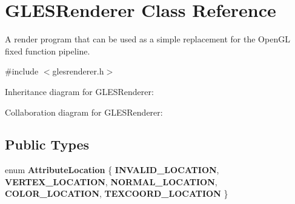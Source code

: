 \hypertarget{class_g_l_e_s_renderer}{}\section{G\+L\+E\+S\+Renderer Class Reference}
\label{class_g_l_e_s_renderer}


A render program that can be used as a simple replacement for the Open\+GL fixed function pipeline.  




{\ttfamily \#include $<$glesrenderer.\+h$>$}



Inheritance diagram for G\+L\+E\+S\+Renderer\+:


Collaboration diagram for G\+L\+E\+S\+Renderer\+:
\subsection*{Public Types}
\begin{DoxyCompactItemize}
\item 
\mbox{\label{class_g_l_e_s_renderer_a05f4cf233d5cf60f4d6ea50ddc06a2c4}} 
enum {\bfseries Attribute\+Location} \{ \newline
{\bfseries I\+N\+V\+A\+L\+I\+D\+\_\+\+L\+O\+C\+A\+T\+I\+ON}, 
{\bfseries V\+E\+R\+T\+E\+X\+\_\+\+L\+O\+C\+A\+T\+I\+ON}, 
{\bfseries N\+O\+R\+M\+A\+L\+\_\+\+L\+O\+C\+A\+T\+I\+ON}, 
{\bfseries C\+O\+L\+O\+R\+\_\+\+L\+O\+C\+A\+T\+I\+ON}, 
\newline
{\bfseries T\+E\+X\+C\+O\+O\+R\+D\+\_\+\+L\+O\+C\+A\+T\+I\+ON}
 \}
\end{DoxyCompactItemize}
